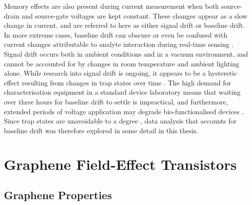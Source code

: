 \documentclass[
  a4paper,
]{scrbook}
\begin{document}
Memory effects are also present during current measurement when both
source-drain and source-gate voltages are kept constant. These changes
appear as a slow change in current, and are referred to here as either
signal drift or baseline drift. In more extreme cases, baseline drift
can obscure or even be confused with current changes attributable to
analyte interaction during real-time sensing \autocite{Noyce2019}.
Signal drift occurs both in ambient conditions and in a vacuum
environment, and cannot be accounted for by changes in room temperature
and ambient lighting alone. While research into signal drift is ongoing,
it appears to be a hysteretic effect resulting from changes in trap
states over time \autocite{Lin2006,Bargaoui2018,Noyce2019}. The high
demand for characterisation equipment in a standard device laboratory
means that waiting over three hours for baseline drift to settle is
impractical, and furthermore, extended periods of voltage application
may degrade bio-functionalised devices \autocite{Noyce2019}. Since trap
states are unavoidable to a degree \autocite{DiMaria1993,Collins2000},
data analysis that accounts for baseline drift was therefore explored in
some detail in this thesis.

\hypertarget{graphene-field-effect-transistors}{%
\section{Graphene Field-Effect
Transistors}\label{graphene-field-effect-transistors}}

\hypertarget{graphene-properties}{%
\subsection{Graphene Properties}\label{graphene-properties}}
\end{document}
